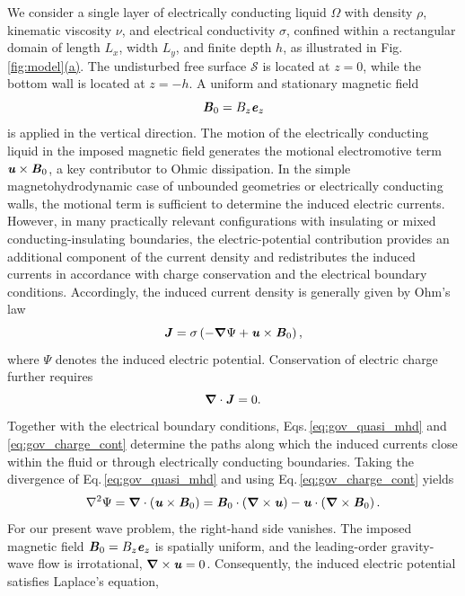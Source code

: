 \documentclass[aps,prfluids,reprint,superscriptaddress]{revtex4-2}
\newcommand{\h}[1]{\textbf{\textit{#1}}}
\newcommand{\subref}[2]{\ref{#1}\hyperref[#1]{(#2)}}
\begin{document}
We consider a single layer of electrically conducting liquid $\Omega$ with density $\rho$, kinematic viscosity $\nu$, and electrical conductivity $\sigma$, confined within a rectangular domain of length $L_x$, width $L_y$, and finite depth $h$, as illustrated in Fig.\,\subref{fig:model}{a}. The undisturbed free surface $\mathcal{S}$ is located at $z=0$, while the bottom wall is located at $z=-h$. A uniform and stationary magnetic field 
\begin{equation}
	 \h B_0 = B_z \h e_z 
\end{equation} 
is applied in the vertical direction. The motion of the electrically conducting liquid in the imposed magnetic field generates the motional electromotive term $\h u\times\h B_0$, a key contributor to Ohmic dissipation. In the simple magnetohydrodynamic case of unbounded geometries or electrically conducting walls, the motional term is sufficient to determine the induced electric currents. However, in many practically relevant configurations with insulating or mixed conducting-insulating boundaries, the electric-potential contribution provides an additional component of the current density and redistributes the induced currents in accordance with charge conservation and the electrical boundary conditions.
Accordingly, the induced current density is generally given by Ohm's law
\begin{equation}
	 \h J = \sigma\left(-\bm\nabla\Psi+\h u\times\h B_0\right), \label{eq:gov_quasi_mhd} 
 \end{equation} 
 where $\Psi$ denotes the induced electric potential. Conservation of electric charge further requires
 \begin{equation} 
 \bm\nabla\cdot\h J=0. \label{eq:gov_charge_cont}
 \end{equation}
Together with the electrical boundary conditions, Eqs.\,\eqref{eq:gov_quasi_mhd} and \eqref{eq:gov_charge_cont} determine the paths along which the induced currents close within the fluid or through electrically conducting boundaries.
Taking the divergence of Eq.\,\eqref{eq:gov_quasi_mhd} and using Eq.\,\eqref{eq:gov_charge_cont} yields 
\begin{equation} 
\nabla^2\Psi = \bm\nabla\cdot \left(\h u\times\h B_0\right) = \h B_0\cdot \left(\bm\nabla\times\h u\right) - \h u\cdot \left(\bm\nabla\times\h B_0\right).
\end{equation} 
For our present wave problem, the right-hand side vanishes. The imposed magnetic field $\h B_0=B_z\h e_z$ is spatially uniform, and the leading-order gravity-wave flow is irrotational, $\bm\nabla\times\h u=0$. Consequently, the induced electric potential satisfies Laplace's equation, 
\end{document}
